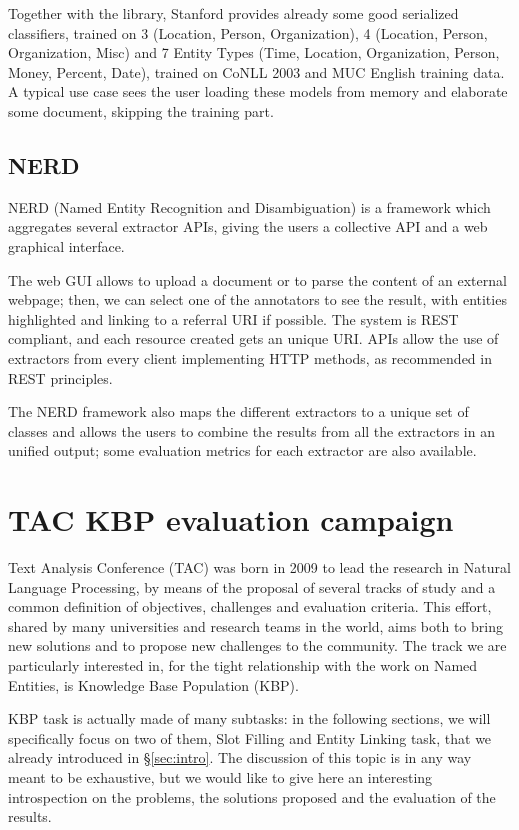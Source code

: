 \documentclass[a4paper,11pt]{report}
\begin{document}
Together with the library, Stanford provides already some good serialized classifiers, trained on 3 (Location, Person, Organization), 4 (Location, Person, Organization, Misc) and 7 Entity Types (Time, Location, Organization, Person, Money, Percent, Date), trained on CoNLL 2003 and MUC English training data. A typical use case sees the user loading these models from memory and elaborate some document, skipping the training part.

\section{NERD}
NERD (Named Entity Recognition and Disambiguation) \cite{rizzo2012nerd} is a framework which aggregates several extractor APIs, giving the users a collective API and a web graphical interface.

The web GUI allows to upload a document or to parse the content of an external webpage; then, we can select one of the annotators to see the result, with entities highlighted and linking to a referral URI if possible. The system is REST compliant, and each resource created gets an unique URI. APIs allow the use of extractors from every client implementing HTTP methods, as recommended in REST principles.

The NERD framework also maps the different extractors to a unique set of classes and allows the users to combine the results from all the extractors in an unified output; some evaluation metrics for each extractor are also available.

\chapter{TAC KBP evaluation campaign}
\label{ch:tac}
Text Analysis Conference (TAC) was born in 2009 to lead the research in Natural Language Processing, by means of the proposal of several tracks of study and a common definition of objectives, challenges and evaluation criteria. This effort, shared by many universities and research teams in the world, aims both to bring new solutions and to propose new challenges to the community. The track we are particularly interested in, for the tight relationship with the work on Named Entities, is Knowledge Base Population (KBP).

KBP task is actually made of many subtasks: in the following sections, we will specifically focus on two of them, Slot Filling and Entity Linking task, that we already introduced in \S \ref{sec:intro}. The discussion of this topic is in any way meant to be exhaustive, but we would like to give here an interesting introspection on the problems, the solutions proposed and the evaluation of the results.
\end{document}
